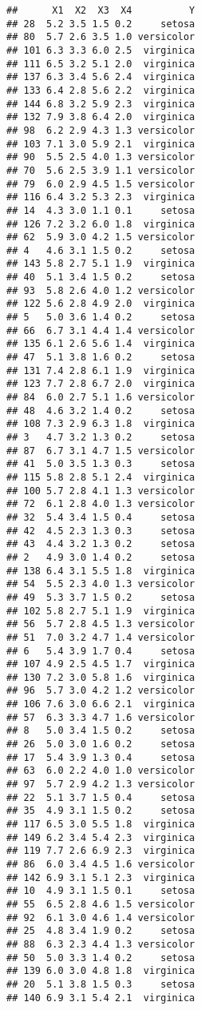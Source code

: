 \documentclass[
]{article}
\begin{document}
\begin{verbatim}
##      X1  X2  X3  X4          Y
## 28  5.2 3.5 1.5 0.2     setosa
## 80  5.7 2.6 3.5 1.0 versicolor
## 101 6.3 3.3 6.0 2.5  virginica
## 111 6.5 3.2 5.1 2.0  virginica
## 137 6.3 3.4 5.6 2.4  virginica
## 133 6.4 2.8 5.6 2.2  virginica
## 144 6.8 3.2 5.9 2.3  virginica
## 132 7.9 3.8 6.4 2.0  virginica
## 98  6.2 2.9 4.3 1.3 versicolor
## 103 7.1 3.0 5.9 2.1  virginica
## 90  5.5 2.5 4.0 1.3 versicolor
## 70  5.6 2.5 3.9 1.1 versicolor
## 79  6.0 2.9 4.5 1.5 versicolor
## 116 6.4 3.2 5.3 2.3  virginica
## 14  4.3 3.0 1.1 0.1     setosa
## 126 7.2 3.2 6.0 1.8  virginica
## 62  5.9 3.0 4.2 1.5 versicolor
## 4   4.6 3.1 1.5 0.2     setosa
## 143 5.8 2.7 5.1 1.9  virginica
## 40  5.1 3.4 1.5 0.2     setosa
## 93  5.8 2.6 4.0 1.2 versicolor
## 122 5.6 2.8 4.9 2.0  virginica
## 5   5.0 3.6 1.4 0.2     setosa
## 66  6.7 3.1 4.4 1.4 versicolor
## 135 6.1 2.6 5.6 1.4  virginica
## 47  5.1 3.8 1.6 0.2     setosa
## 131 7.4 2.8 6.1 1.9  virginica
## 123 7.7 2.8 6.7 2.0  virginica
## 84  6.0 2.7 5.1 1.6 versicolor
## 48  4.6 3.2 1.4 0.2     setosa
## 108 7.3 2.9 6.3 1.8  virginica
## 3   4.7 3.2 1.3 0.2     setosa
## 87  6.7 3.1 4.7 1.5 versicolor
## 41  5.0 3.5 1.3 0.3     setosa
## 115 5.8 2.8 5.1 2.4  virginica
## 100 5.7 2.8 4.1 1.3 versicolor
## 72  6.1 2.8 4.0 1.3 versicolor
## 32  5.4 3.4 1.5 0.4     setosa
## 42  4.5 2.3 1.3 0.3     setosa
## 43  4.4 3.2 1.3 0.2     setosa
## 2   4.9 3.0 1.4 0.2     setosa
## 138 6.4 3.1 5.5 1.8  virginica
## 54  5.5 2.3 4.0 1.3 versicolor
## 49  5.3 3.7 1.5 0.2     setosa
## 102 5.8 2.7 5.1 1.9  virginica
## 56  5.7 2.8 4.5 1.3 versicolor
## 51  7.0 3.2 4.7 1.4 versicolor
## 6   5.4 3.9 1.7 0.4     setosa
## 107 4.9 2.5 4.5 1.7  virginica
## 130 7.2 3.0 5.8 1.6  virginica
## 96  5.7 3.0 4.2 1.2 versicolor
## 106 7.6 3.0 6.6 2.1  virginica
## 57  6.3 3.3 4.7 1.6 versicolor
## 8   5.0 3.4 1.5 0.2     setosa
## 26  5.0 3.0 1.6 0.2     setosa
## 17  5.4 3.9 1.3 0.4     setosa
## 63  6.0 2.2 4.0 1.0 versicolor
## 97  5.7 2.9 4.2 1.3 versicolor
## 22  5.1 3.7 1.5 0.4     setosa
## 35  4.9 3.1 1.5 0.2     setosa
## 117 6.5 3.0 5.5 1.8  virginica
## 149 6.2 3.4 5.4 2.3  virginica
## 119 7.7 2.6 6.9 2.3  virginica
## 86  6.0 3.4 4.5 1.6 versicolor
## 142 6.9 3.1 5.1 2.3  virginica
## 10  4.9 3.1 1.5 0.1     setosa
## 55  6.5 2.8 4.6 1.5 versicolor
## 92  6.1 3.0 4.6 1.4 versicolor
## 25  4.8 3.4 1.9 0.2     setosa
## 88  6.3 2.3 4.4 1.3 versicolor
## 50  5.0 3.3 1.4 0.2     setosa
## 139 6.0 3.0 4.8 1.8  virginica
## 20  5.1 3.8 1.5 0.3     setosa
## 140 6.9 3.1 5.4 2.1  virginica

\end{verbatim}
\end{document}
